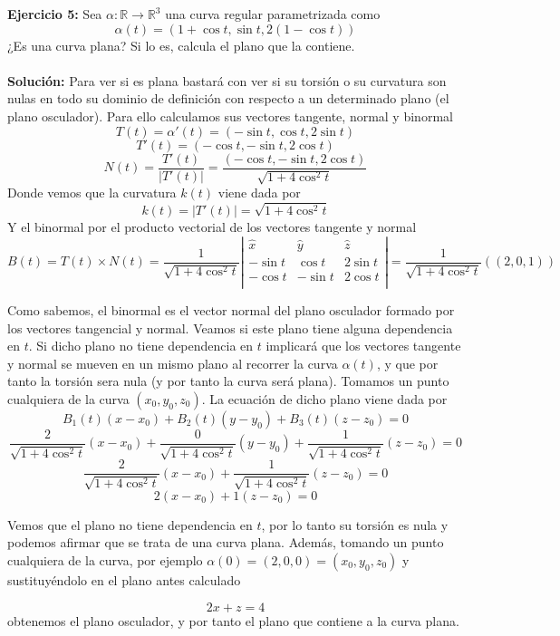 \documentclass[fleqn]{article}
\def\R{\mathds{R}}
\begin{document}
    \newpage

    {\bf{Ejercicio 5:}} Sea $\alpha : \R \rightarrow \R ^3$ una curva regular parametrizada como 
    $$\alpha(t)=\left(1 + \cos t, \sin t, 2(1-\cos t)\right)$$
    ¿Es una curva plana? Si lo es, calcula el plano que la contiene.\\ \\

    {\bf{Solución:}} Para ver si es plana bastará con ver si su torsión o su curvatura son nulas en todo su dominio de definición con respecto
    a un determinado plano (el plano osculador). Para ello calculamos sus vectores tangente, normal y binormal
    $$T(t)=\alpha '(t)=\left(-\sin t, \cos t, 2\sin t\right)$$
    $$T'(t)=\left(-\cos t,- \sin t, 2\cos t\right)$$
    $$N(t)=\frac{T'(t)}{|T'(t)|}=\frac{\left(-\cos t,- \sin t, 2\cos t\right)}{\sqrt{1+4\cos^2 t}}$$
    Donde vemos que la curvatura $k(t)$ viene dada por
    $$k(t)=|T'(t)|=\sqrt{1+4\cos^2 t}$$
    Y el binormal por el producto vectorial de los vectores tangente y normal
    $$B(t)=T(t)\times N(t)=\frac{1}{\sqrt{1+4\cos^2 t}} \left|
    \begin{matrix}
        \hat{x} & \hat{y} & \hat{z} \\
        -\sin t & \cos t & 2\sin t \\
        -\cos t & -\sin t & 2\cos t \\
    \end{matrix} \right|
    = \frac{1}{\sqrt{1+4\cos^2 t}} (\left(2,0,1\right)) $$
    
    Como sabemos, el binormal es el vector normal del plano osculador formado por los vectores tangencial y normal. Veamos si este plano tiene
    alguna dependencia en $t$. Si dicho plano no tiene dependencia en $t$ implicará que los vectores tangente y normal se mueven en un mismo plano
    al recorrer la curva $\alpha(t)$, y que por tanto la torsión sera nula (y por tanto la curva será plana). Tomamos un punto cualquiera de la curva
    $(x_0, y_0, z_0)$. La ecuación de dicho plano viene dada por
    $$B_1(t)(x-x_0) + B_2(t)(y-y_0) + B_3(t)(z-z_0)=0$$
    $$\frac{2}{\sqrt{1+4\cos^2 t}}(x-x_0) + \frac{0}{\sqrt{1+4\cos^2 t}}(y-y_0) + \frac{1}{\sqrt{1+4\cos^2 t}}(z-z_0)=0$$
    $$\frac{2}{\sqrt{1+4\cos^2 t}}(x-x_0) + \frac{1}{\sqrt{1+4\cos^2 t}}(z-z_0)=0$$
    $$2(x-x_0) + 1(z-z_0)=0$$

    Vemos que el plano no tiene dependencia en $t$, por lo tanto su torsión es nula y podemos afirmar que se trata de una curva plana.
    Además, tomando un punto cualquiera de la curva, por ejemplo $\alpha(0)=(2,0,0)=(x_0, y_0, z_0)$ y sustituyéndolo en el plano antes calculado

    $$2x+z=4$$
    obtenemos el plano osculador, y por tanto el plano que contiene a la curva plana.
\end{document}
